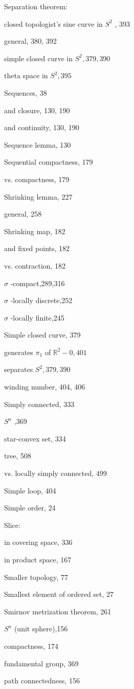 Separation theorem:

closed topologist’s sine curve in \({S}^{2}\) , 393

general, 380, 392

simple closed curve in \({S}^{2},{379},{390}\)

theta space in \({S}^{2},{395}\)

Sequences, 38

and closure, 130, 190

and continuity, 130, 190

Sequence lemma, 130

Sequential compactness, 179

vs. compactness, 179

Shrinking lemma, 227

general, 258

Shrinking map, 182

and fixed points, 182

vs. contraction, 182

\(\sigma\) -compact,289,316

\(\sigma\) -locally discrete,252

\(\sigma\) -locally finite,245

Simple closed curve, 379

generates \({\pi }_{1}\) of \({\mathbb{R}}^{2} - 0,{401}\)

separates \({S}^{2},{379},{390}\)

winding number, 404, 406

Simply connected, 333

\({S}^{n}\) ,369

star-convex set, 334

tree, 508

vs. locally simply connected, 499

Simple loop, 404

Simple order, 24

Slice:

in covering space, 336

in product space, 167

Smaller topology, 77

Smallest element of ordered set, 27

Smirnov metrization theorem, 261

\({S}^{n}\) (unit sphere),156

compactness, 174

fundamental group, 369

path connectedness, 156

